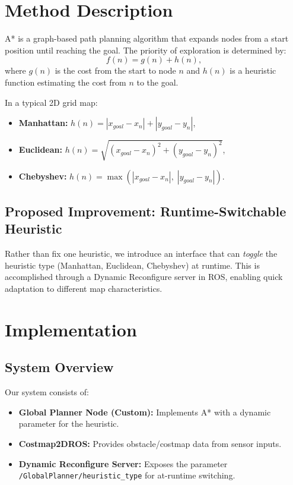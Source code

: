 \documentclass[letterpaper, 10 pt, conference]{ieeeconf}
\begin{document}
\section{Method Description}\label{sec:method}
A* \cite{hart1968formal} is a graph-based path planning algorithm that expands 
nodes from a start position until reaching the goal. The priority of exploration 
is determined by:
\begin{equation}
f(n) = g(n) + h(n),
\end{equation}
where $g(n)$ is the cost from the start to node $n$ and $h(n)$ is a heuristic 
function estimating the cost from $n$ to the goal. 

In a typical 2D grid map:
\begin{itemize}
    \item \textbf{Manhattan:} $h(n) = |x_{goal} - x_n| + |y_{goal} - y_n|$,
    \item \textbf{Euclidean:} $h(n) = \sqrt{(x_{goal}-x_n)^2 + (y_{goal}-y_n)^2}$,
    \item \textbf{Chebyshev:} $h(n) = \max(|x_{goal} - x_n|,\; |y_{goal} - y_n|).$
\end{itemize}

\subsection{Proposed Improvement: Runtime-Switchable Heuristic}
Rather than fix one heuristic, we introduce an interface that can \textit{toggle} 
the heuristic type (Manhattan, Euclidean, Chebyshev) at runtime. This is accomplished 
through a Dynamic Reconfigure server in ROS, enabling quick adaptation to different 
map characteristics.

\section{Implementation}\label{sec:implementation}

\subsection{System Overview}
Our system consists of:
\begin{itemize}
    \item \textbf{Global Planner Node (Custom):} Implements A* with a dynamic 
    parameter for the heuristic.
    \item \textbf{Costmap2DROS:} Provides obstacle/costmap data from sensor inputs.
    \item \textbf{Dynamic Reconfigure Server:} Exposes the parameter 
    \texttt{/GlobalPlanner/heuristic\_type} for at-runtime switching.
\end{itemize}
\end{document}
